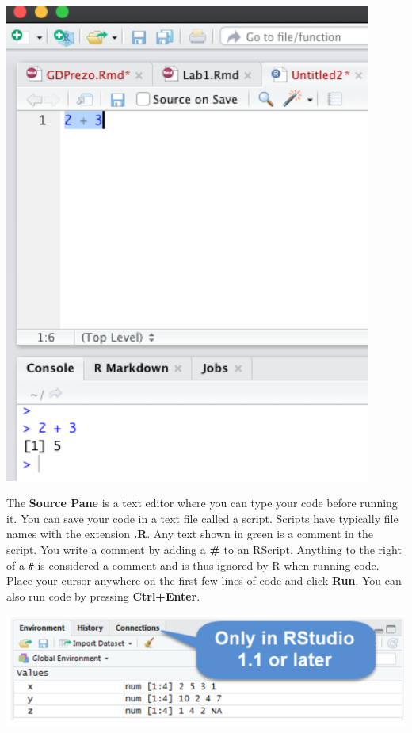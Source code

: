 \documentclass[
]{book}
\theoremstyle{definition}
\theoremstyle{definition}
\theoremstyle{definition}
\theoremstyle{definition}
\theoremstyle{remark}
\begin{document}
\includegraphics[width=4.75in]{png/Rstudio5}

The \textbf{Source Pane} is a text editor where you can type your code before running it. You can save your code in a text file called a script. Scripts have typically file names with the extension \textbf{.R}. Any text shown in green is a comment in the script. You write a comment by adding a \textbf{\#} to an RScript. Anything to the right of a \texttt{\#} is considered a comment and is thus ignored by R when running code. Place your cursor anywhere on the first few lines of code and click \textbf{Run}. You can also run code by pressing \textbf{Ctrl+Enter}.

\includegraphics[width=8.12in]{png/Rstudio3}
\end{document}
